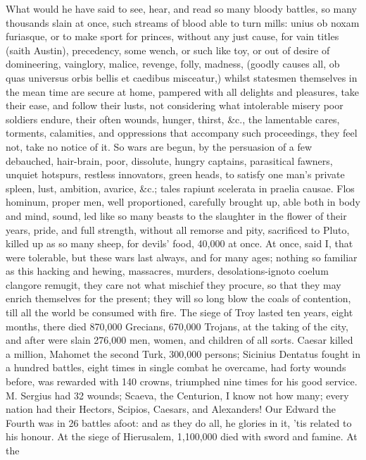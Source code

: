 {What would he have said to see, hear, and read so many bloody battles,
so many thousands slain at once, such streams of blood able to turn
mills: unius ob noxam furiasque, or to make sport for princes, without
any just cause, for vain titles (saith Austin), precedency, some
wench, or such like toy, or out of desire of domineering, vainglory,
malice, revenge, folly, madness, (goodly causes all, ob quas universus
orbis bellis et caedibus misceatur,) whilst statesmen themselves in the
mean time are secure at home, pampered with all delights and pleasures,
take their ease, and follow their lusts, not considering what
intolerable misery poor soldiers endure, their often wounds, hunger,
thirst, \&c., the lamentable cares, torments, calamities, and
oppressions that accompany such proceedings, they feel not, take no
notice of it. So wars are begun, by the persuasion of a few debauched,
hair-brain, poor, dissolute, hungry captains, parasitical fawners,
unquiet hotspurs, restless innovators, green heads, to satisfy one
man's private spleen, lust, ambition, avarice, \&c.; tales rapiunt
scelerata in praelia causae. Flos hominum, proper men, well
proportioned, carefully brought up, able both in body and mind, sound,
led like so many beasts to the slaughter in the flower of their
years, pride, and full strength, without all remorse and pity,
sacrificed to Pluto, killed up as so many sheep, for devils' food,
40,000 at once. At once, said I, that were tolerable, but these wars
last always, and for many ages; nothing so familiar as this hacking and
hewing, massacres, murders, desolations-ignoto coelum clangore remugit,
they care not what mischief they procure, so that they may enrich
themselves for the present; they will so long blow the coals of
contention, till all the world be consumed with fire. The siege of
Troy lasted ten years, eight months, there died 870,000 Grecians,
670,000 Trojans, at the taking of the city, and after were slain
276,000 men, women, and children of all sorts. Caesar killed a million,
Mahomet the second Turk, 300,000 persons; Sicinius Dentatus fought
in a hundred battles, eight times in single combat he overcame, had
forty wounds before, was rewarded with 140 crowns, triumphed nine times
for his good service. M. Sergius had 32 wounds; Scaeva, the Centurion,
I know not how many; every nation had their Hectors, Scipios, Caesars,
and Alexanders! Our Edward the Fourth was in 26 battles afoot: and
as they do all, he glories in it, 'tis related to his honour. At the
siege of Hierusalem, 1,100,000 died with sword and famine. At the
}
